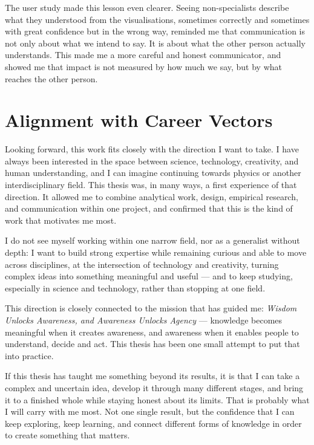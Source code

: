 The user study made this lesson even clearer. Seeing non-specialists describe what they understood from the visualisations, sometimes correctly and sometimes with great confidence but in the wrong way, reminded me that communication is not only about what we intend to say. It is about what the other person actually understands. This made me a more careful and honest communicator, and showed me that impact is not measured by how much we say, but by what reaches the other person.

\section{Alignment with Career Vectors}
\label{sec:alignment}

Looking forward, this work fits closely with the direction I want to take. I have always been interested in the space between science, technology, creativity, and human understanding, and I can imagine continuing towards physics or another interdisciplinary field. This thesis was, in many ways, a first experience of that direction. It allowed me to combine analytical work, design, empirical research, and communication within one project, and confirmed that this is the kind of work that motivates me most.

I do not see myself working within one narrow field, nor as a generalist without depth: I want to build strong expertise while remaining curious and able to move across disciplines, at the intersection of technology and creativity, turning complex ideas into something meaningful and useful --- and to keep studying, especially in science and technology, rather than stopping at one field.

This direction is closely connected to the mission that has guided me: \emph{Wisdom Unlocks Awareness, and Awareness Unlocks Agency} --- knowledge becomes meaningful when it creates awareness, and awareness when it enables people to understand, decide and act. This thesis has been one small attempt to put that into practice.

If this thesis has taught me something beyond its results, it is that I can take a complex and uncertain idea, develop it through many different stages, and bring it to a finished whole while staying honest about its limits. That is probably what I will carry with me most. Not one single result, but the confidence that I can keep exploring, keep learning, and connect different forms of knowledge in order to create something that matters.